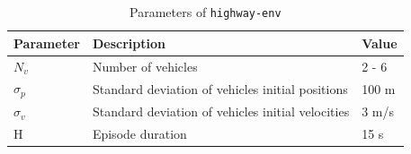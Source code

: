 \begin{subappendices}
\begin{table}[ht!]
	\centering
	\begin{tabular}{lll}
		\toprule
		Parameter & Description & Value\tabularnewline
		\midrule
		$N_v$& Number of vehicles & 2 - 6\tabularnewline
		$\sigma_p$& Standard deviation of vehicles initial positions & 100 m\tabularnewline
		$\sigma_v$& Standard deviation of vehicles initial velocities & 3 m/s\tabularnewline
		H & Episode duration & 15 s\tabularnewline
		\bottomrule
	\end{tabular}
	
	\caption{Parameters of \texttt{highway-env}}
	\label{tab:param-highway-env}
\end{table}

\end{subappendices}